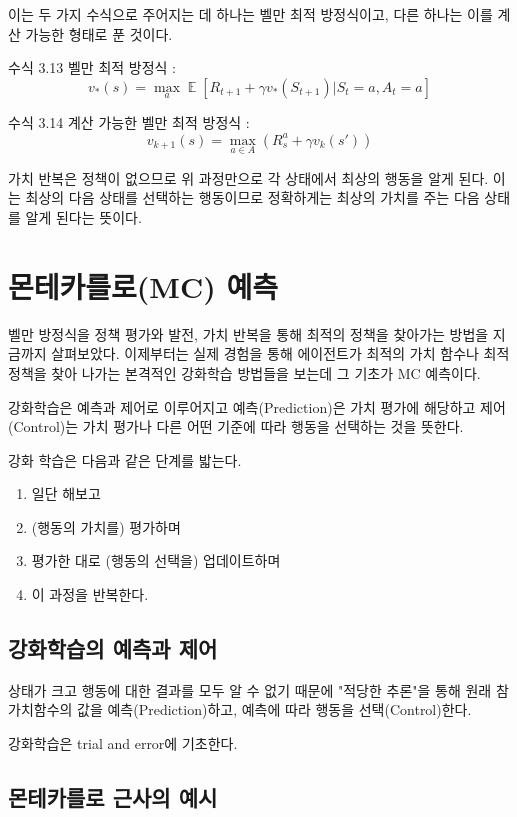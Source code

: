 \documentclass[ %
    a4paper,    %
    amsmath,    %
    itemph,     %
]{oblivoir}     %
\DeclareMathOperator{\E}{\mathbb{E}}
\begin{document}
이는 두 가지 수식으로 주어지는 데 하나는 벨만 최적 방정식이고, 다른 하나는 
이를 계산 가능한 형태로 푼 것이다. 

수식 3.13 벨만 최적 방정식 : 
$$
v_*(s) = \max_a \E[R_{t+1} + \gamma v_*(S_{t+1}) | S_t = a, A_t = a]
$$

수식 3.14 계산 가능한 벨만 최적 방정식 : 
$$
v_{k+1}(s) = \max_{a \in A} (R_s^a + \gamma v_k(s'))
$$

가치 반복은 정책이 없으므로 위 과정만으로 각 상태에서 최상의 행동을 알게 된다. 
이는 최상의 다음 상태를 선택하는 행동이므로 정확하게는 최상의 가치를 주는 
다음 상태를 알게 된다는 뜻이다. 

\section{몬테카를로(MC) 예측}

벨만 방정식을 정책 평가와 발전, 가치 반복을 통해 최적의 정책을 찾아가는 
방법을 지금까지 살펴보았다. 이제부터는 실제 경험을 통해 에이전트가 
최적의 가치 함수나 최적 정책을 찾아 나가는 본격적인 강화학습 방법들을 
보는데 그 기초가 MC 예측이다. 

강화학습은 예측과 제어로 이루어지고 예측(Prediction)은 가치 평가에 해당하고 
제어(Control)는 가치 평가나 다른 어떤 기준에 따라 행동을 선택하는 것을 뜻한다. 

강화 학습은 다음과 같은 단계를 밟는다. 

\begin{enumerate}
\item 일단 해보고 
\item (행동의 가치를) 평가하며
\item 평가한 대로 (행동의 선택을) 업데이트하며 
\item 이 과정을 반복한다. 
\end{enumerate}

\subsection{강화학습의 예측과 제어}

상태가 크고 행동에 대한 결과를 모두 알 수 없기 때문에 "적당한 추론"을 통해 
원래 참 가치함수의 값을 예측(Prediction)하고, 예측에 따라 행동을 선택(Control)한다. 

강화학습은 trial and error에 기초한다. 

\subsection{몬테카를로 근사의 예시}
\end{document}
